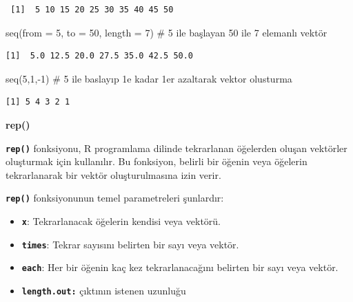\documentclass[
  letterpaper,
  DIV=11,
  numbers=noendperiod]{scrreprt}
\newenvironment{Shaded}{\begin{snugshade}}{\end{snugshade}}
\newcommand{\AttributeTok}[1]{\textcolor[rgb]{0.40,0.45,0.13}{#1}}
\newcommand{\CommentTok}[1]{\textcolor[rgb]{0.37,0.37,0.37}{#1}}
\newcommand{\DecValTok}[1]{\textcolor[rgb]{0.68,0.00,0.00}{#1}}
\newcommand{\FunctionTok}[1]{\textcolor[rgb]{0.28,0.35,0.67}{#1}}
\newcommand{\NormalTok}[1]{\textcolor[rgb]{0.00,0.23,0.31}{#1}}
\newcommand{\SpecialCharTok}[1]{\textcolor[rgb]{0.37,0.37,0.37}{#1}}
\begin{document}
\begin{verbatim}
 [1]  5 10 15 20 25 30 35 40 45 50
\end{verbatim}

\begin{Shaded}
\begin{Highlighting}[]
\FunctionTok{seq}\NormalTok{(}\AttributeTok{from =} \DecValTok{5}\NormalTok{, }\AttributeTok{to =} \DecValTok{50}\NormalTok{, }\AttributeTok{length =} \DecValTok{7}\NormalTok{) }\CommentTok{\# 5 ile başlayan 50 ile 7 elemanlı vektör}
\end{Highlighting}
\end{Shaded}

\begin{verbatim}
[1]  5.0 12.5 20.0 27.5 35.0 42.5 50.0
\end{verbatim}

\begin{Shaded}
\begin{Highlighting}[]
\FunctionTok{seq}\NormalTok{(}\DecValTok{5}\NormalTok{,}\DecValTok{1}\NormalTok{,}\SpecialCharTok{{-}}\DecValTok{1}\NormalTok{) }\CommentTok{\# 5 ile baslayıp 1\textquotesingle{}e kadar 1\textquotesingle{}er azaltarak vektor olusturma}
\end{Highlighting}
\end{Shaded}

\begin{verbatim}
[1] 5 4 3 2 1
\end{verbatim}

\textbf{rep()}

\textbf{\texttt{rep()}} fonksiyonu, R programlama dilinde tekrarlanan
öğelerden oluşan vektörler oluşturmak için kullanılır. Bu fonksiyon,
belirli bir öğenin veya öğelerin tekrarlanarak bir vektör
oluşturulmasına izin verir.

\textbf{\texttt{rep()}} fonksiyonunun temel parametreleri şunlardır:

\begin{itemize}
\item
  \textbf{\texttt{x}}: Tekrarlanacak öğelerin kendisi veya vektörü.
\item
  \textbf{\texttt{times}}: Tekrar sayısını belirten bir sayı veya
  vektör.
\item
  \textbf{\texttt{each}}: Her bir öğenin kaç kez tekrarlanacağını
  belirten bir sayı veya vektör.
\item
  \textbf{\texttt{length.out:}} çıktının istenen uzunluğu
\end{itemize}
\end{document}
